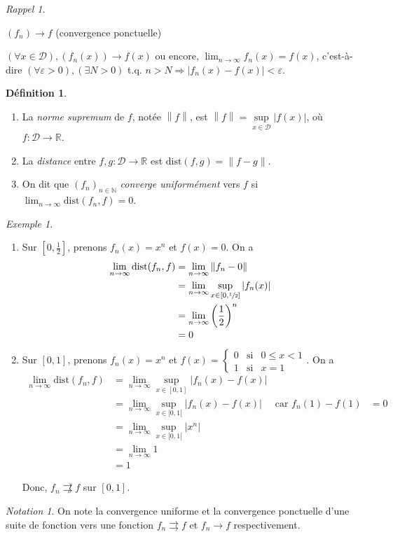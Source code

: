 \documentclass{report}
\newcommand*{\dlim}[3]{\displaystyle\lim_{#1 \to #2}#3}
\newcommand*{\norme}[1]{\left\| #1 \right\|}
\newcommand*{\abs}[1]{\left| #1 \right|}
\newcommand*{\convuni}{\rightrightarrows}
\newcommand*{\eps}{\varepsilon}
\newcommand*{\lte}{\leqslant}
\newcommand*{\reels}{\mathbb{R}}
\newcommand*{\naturels}{\mathbb{N}}
\theoremstyle{definition}
\newtheorem*{defin}{D\'efinition}
\theoremstyle{remark}
\newtheorem*{exem}{Exemple}
\newtheorem*{nota}{Notation}
\newtheorem*{rapp}{Rappel}
\begin{document}
	\begin{rapp}~

		$(f_n) \to f$ (convergence ponctuelle)

		$(\forall  x \in \mathcal{D}), (f_n(x)) \to f(x)$ ou encore, $\dlim{n}{\infty}{f_n(x)} = f(x)$, c'est-\`a-dire $(\forall\eps>0), (\exists N>0)$ t.q. $n>N \Rightarrow \abs{f_n(x) - f(x)} < \eps$.
	\end{rapp}
	\begin{defin}
		~

		\begin{enumerate}
			\item La \emph{norme supremum} de $f$, not\'ee $\norme{f}$, est $\norme{f} = \sup\limits_{x \in \mathcal{D}}\abs{f(x)}$, o\`u $f:\mathcal{D}\to\reels$.
			\item La \emph{distance} entre $f,g:\mathcal{D}\to\reels$ est $\mathrm{dist}(f,g) = \norme{f-g}$.
			\item On dit que $(f_n)_{n \in \naturels}$ \emph{converge uniform\'ement} vers $f$ si $\dlim{n}{\infty}{\mathrm{dist}(f_n,f)}=0$.
		\end{enumerate}
	\end{defin}
	\begin{exem}
		~

		\begin{enumerate}
			\item Sur $[0,\frac{1}{2}]$, prenons $f_n(x)=x^n$ et $f(x) = 0$. On a
			\begin{align*}
				\dlim{n}{\infty}{\mathrm{dist}(f_n,f)}&= \dlim{n}{\infty}{\norme{f_n-0}}\\
				&= \dlim{n}{\infty}{\sup\limits_{x \in [0,\sfrac{1}{2}]}\abs{f_n(x)}}\\
				&= \dlim{n}{\infty}{\left(\dfrac{1}{2}\right)^n}\\
				&= 0
			\end{align*}
			\item Sur $[0,1]$, prenons $f_n(x)=x^n$ et $f(x) = \left\lbrace \begin{array}{lll}
				0&\text{si}&0\lte x<1\\
				1&\text{si}&x=1
			\end{array}\right.$. On a
			\begin{align*}
				\dlim{n}{\infty}{\mathrm{dist}(f_n,f)}&= \dlim{n}{\infty}{\sup\limits_{x \in [0,1]}\abs{f_n(x)-f(x)}}\\
				&= \dlim{n}{\infty}{\sup\limits_{x \in [0,1[}\abs{f_n(x)-f(x)}}&\text{car }f_n(1)-f(1)&=0\\
				&= \dlim{n}{\infty}{\sup\limits_{x \in [0,1[}\abs{x^n}}\\
				&= \dlim{n}{\infty}{1}\\
				&= 1
			\end{align*}

			Donc, $f_n \not\convuni f$ sur $[0,1]$.
		\end{enumerate}
		\begin{nota}
			On note la convergence uniforme et la convergence ponctuelle d'une suite de fonction vers une fonction $f_n \convuni f$ et $f_n \to f$ respectivement.
		\end{nota}
	\end{exem}
\end{document}

